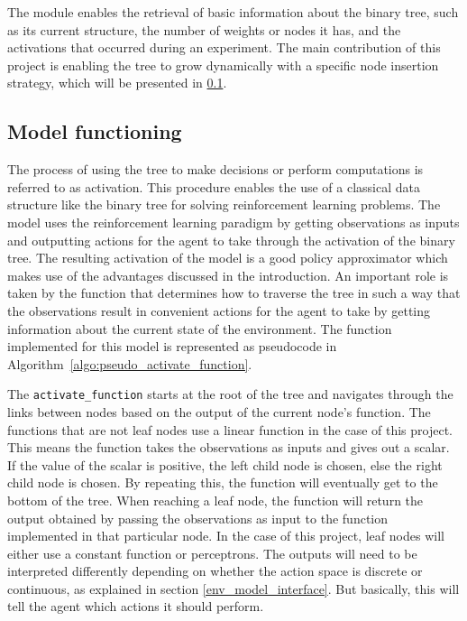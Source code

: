The module enables the retrieval of basic information about the binary tree, such as its current structure, the number of weights or nodes it has, and the activations that occurred during an experiment. The main contribution of this project is enabling the tree to grow dynamically with a specific node insertion strategy, which will be presented in \ref{model_functioning}.

\subsection{Model functioning}
\label{model_functioning}

The process of using the tree to make decisions or perform computations is referred to as activation. This procedure enables the use of a classical data structure like the binary tree for solving reinforcement learning problems. The model uses the reinforcement learning paradigm by getting observations as inputs and outputting actions for the agent to take through the activation of the binary tree. The resulting activation of the model is a good policy approximator which makes use of the advantages discussed in the introduction. An important role is taken by the function that determines how to traverse the tree in such a way that the observations result in convenient actions for the agent to take by getting information about the current state of the environment. The function implemented for this model is represented as pseudocode in Algorithm~\ref{algo:pseudo_activate_function}.

The \texttt{activate\_function} starts at the root of the tree and navigates through the links between nodes based on the output of the current node's function. The functions that are not leaf nodes use a linear function in the case of this project. This means the function takes the observations as inputs and gives out a scalar. If the value of the scalar is positive, the left child node is chosen, else the right child node is chosen. By repeating this, the function will eventually get to the bottom of the tree. When reaching a leaf node, the function will return the output obtained by passing the observations as input to the function implemented in that particular node. In the case of this project, leaf nodes will either use a constant function or perceptrons. The outputs will need to be interpreted differently depending on whether the action space is discrete or continuous, as explained in section \ref{env_model_interface}. But basically, this will tell the agent which actions it should perform.


